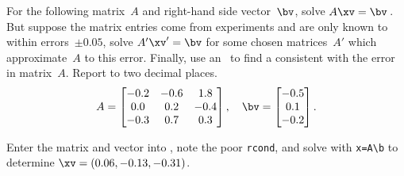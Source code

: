 \begin{example} \label{eg:3regmata}
For the following matrix~\(A\) and right-hand side vector~\(\bv\),
solve \(A\xv=\bv\)\,.
But suppose the matrix entries come from experiments and are only known to within errors~\(\pm0.05\),  solve \(A'\xv'=\bv\) for some chosen matrices~\(A'\) which approximate~\(A\) to this error.
Finally, use an \svd\ to find a  consistent with the error in matrix~\(A\).
Report to two decimal places.
\begin{equation*}
A=\begin{bmatrix} -0.2&-0.6&1.8
\\ 0.0&0.2&-0.4
\\ -0.3&0.7&0.3 \end{bmatrix},\quad
\bv=\begin{bmatrix} -0.5
\\ 0.1
\\ -0.2
 \end{bmatrix}.
\end{equation*}
\begin{solution} 
Enter the matrix and vector into \script, note the poor \verb|rcond|, and solve with \verb|x=A\b| to determine \(\xv=(0.06,-0.13,-0.31)\).
\setbox\ajrqrbox\hbox{}%
\marginajrbox%


\end{solution}
\end{example}

